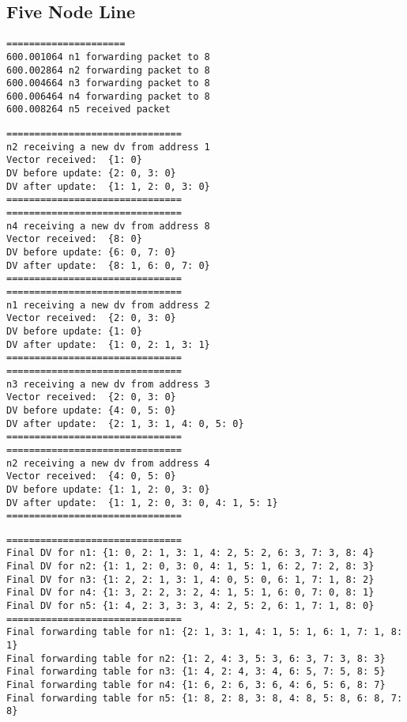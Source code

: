 \documentclass[11pt]{article}
\begin{document}
\subsection{Five Node Line}

 \begin{lstlisting} 
=====================
600.001064 n1 forwarding packet to 8
600.002864 n2 forwarding packet to 8
600.004664 n3 forwarding packet to 8
600.006464 n4 forwarding packet to 8
600.008264 n5 received packet
\end{lstlisting}

 \begin{lstlisting} 
===============================
n2 receiving a new dv from address 1
Vector received:  {1: 0}
DV before update: {2: 0, 3: 0}
DV after update:  {1: 1, 2: 0, 3: 0}
===============================
===============================
n4 receiving a new dv from address 8
Vector received:  {8: 0}
DV before update: {6: 0, 7: 0}
DV after update:  {8: 1, 6: 0, 7: 0}
===============================
===============================
n1 receiving a new dv from address 2
Vector received:  {2: 0, 3: 0}
DV before update: {1: 0}
DV after update:  {1: 0, 2: 1, 3: 1}
===============================
===============================
n3 receiving a new dv from address 3
Vector received:  {2: 0, 3: 0}
DV before update: {4: 0, 5: 0}
DV after update:  {2: 1, 3: 1, 4: 0, 5: 0}
===============================
===============================
n2 receiving a new dv from address 4
Vector received:  {4: 0, 5: 0}
DV before update: {1: 1, 2: 0, 3: 0}
DV after update:  {1: 1, 2: 0, 3: 0, 4: 1, 5: 1}
===============================
\end{lstlisting}

 \begin{lstlisting} 
===============================
Final DV for n1: {1: 0, 2: 1, 3: 1, 4: 2, 5: 2, 6: 3, 7: 3, 8: 4}
Final DV for n2: {1: 1, 2: 0, 3: 0, 4: 1, 5: 1, 6: 2, 7: 2, 8: 3}
Final DV for n3: {1: 2, 2: 1, 3: 1, 4: 0, 5: 0, 6: 1, 7: 1, 8: 2}
Final DV for n4: {1: 3, 2: 2, 3: 2, 4: 1, 5: 1, 6: 0, 7: 0, 8: 1}
Final DV for n5: {1: 4, 2: 3, 3: 3, 4: 2, 5: 2, 6: 1, 7: 1, 8: 0}
===============================
Final forwarding table for n1: {2: 1, 3: 1, 4: 1, 5: 1, 6: 1, 7: 1, 8: 1}
Final forwarding table for n2: {1: 2, 4: 3, 5: 3, 6: 3, 7: 3, 8: 3}
Final forwarding table for n3: {1: 4, 2: 4, 3: 4, 6: 5, 7: 5, 8: 5}
Final forwarding table for n4: {1: 6, 2: 6, 3: 6, 4: 6, 5: 6, 8: 7}
Final forwarding table for n5: {1: 8, 2: 8, 3: 8, 4: 8, 5: 8, 6: 8, 7: 8}
\end{lstlisting}
\end{document}
